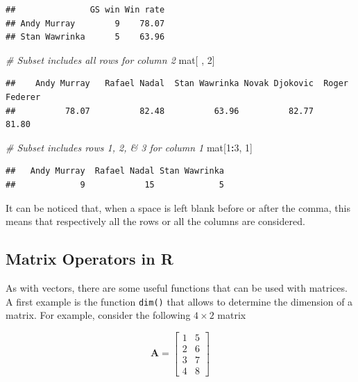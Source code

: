 \documentclass[12pt,]{krantz}
\newenvironment{Shaded}{\begin{snugshade}}{\end{snugshade}}
\newcommand{\DecValTok}[1]{\textcolor[rgb]{0.06,0.06,0.06}{#1}}
\newcommand{\CommentTok}[1]{\textcolor[rgb]{0.37,0.37,0.37}{\textit{#1}}}
\newcommand{\OperatorTok}[1]{\textcolor[rgb]{0.43,0.43,0.43}{\textbf{#1}}}
\newcommand{\NormalTok}[1]{#1}
\begin{document}
\begin{verbatim}
##               GS win Win rate
## Andy Murray        9    78.07
## Stan Wawrinka      5    63.96
\end{verbatim}

\begin{Shaded}
\begin{Highlighting}[]
\CommentTok{# Subset includes all rows for column 2  }
\NormalTok{mat[ , }\DecValTok{2}\NormalTok{]}
\end{Highlighting}
\end{Shaded}

\begin{verbatim}
##    Andy Murray   Rafael Nadal  Stan Wawrinka Novak Djokovic  Roger Federer 
##          78.07          82.48          63.96          82.77          81.80
\end{verbatim}

\begin{Shaded}
\begin{Highlighting}[]
\CommentTok{# Subset includes rows 1, 2, & 3 for column 1  }
\NormalTok{mat[}\DecValTok{1}\OperatorTok{:}\DecValTok{3}\NormalTok{, }\DecValTok{1}\NormalTok{]}
\end{Highlighting}
\end{Shaded}

\begin{verbatim}
##   Andy Murray  Rafael Nadal Stan Wawrinka 
##             9            15             5
\end{verbatim}

It can be noticed that, when a space is left blank before or after the
comma, this means that respectively all the rows or all the columns are
considered.

\subsection{Matrix Operators in R}\label{matrix-operators-in-r}

As with vectors, there are some useful functions that can be used with
matrices. A first example is the function \texttt{dim()} that allows to
determine the dimension of a matrix. For example, consider the following
\(4 \times 2\) matrix

\begin{equation*}
\mathbf{A} = \left[
\begin{matrix}
1 & 5\\
2 & 6\\
3 & 7\\
4 & 8
\end{matrix}
\right]
\end{equation*}
\end{document}
